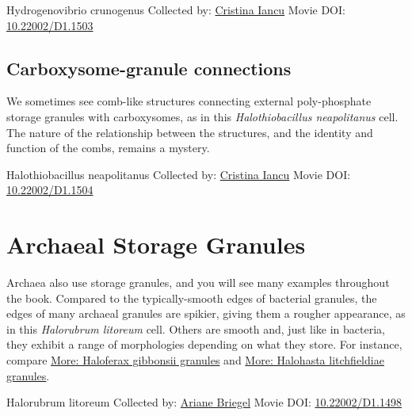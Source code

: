 \documentclass[]{tufte-book}
\begin{document}
\hypertarget{htmlwidget-d8c938f170242b9a8928}{}

\label{fig:4-9a}Hydrogenovibrio crunogenus Collected by: \protect\hyperlink{cristina_iancu}{Cristina Iancu} Movie DOI: \href{https://doi.org/10.22002/D1.1503}{10.22002/D1.1503}

\hypertarget{Carboxysome-granule_connections}{%
\subsection{Carboxysome-granule connections}\label{Carboxysome-granule_connections}}

We sometimes see comb-like structures connecting external poly-phosphate storage granules with carboxysomes, as in this \emph{Halothiobacillus neapolitanus} cell. The nature of the relationship between the structures, and the identity and function of the combs, remains a mystery.



\hypertarget{htmlwidget-87f6a2f9fd1053e7b88b}{}

\label{fig:4-9b}Halothiobacillus neapolitanus Collected by: \protect\hyperlink{cristina_iancu}{Cristina Iancu} Movie DOI: \href{https://doi.org/10.22002/D1.1504}{10.22002/D1.1504}

\hypertarget{archaeal-storage-granules}{%
\section{Archaeal Storage Granules}\label{archaeal-storage-granules}}

Archaea also use storage granules, and you will see many examples throughout the book. Compared to the typically-smooth edges of bacterial granules, the edges of many archaeal granules are spikier, giving them a rougher appearance, as in this \emph{Halorubrum litoreum} cell. Others are smooth and, just like in bacteria, they exhibit a range of morphologies depending on what they store. For instance, compare \protect\hyperlink{Haloferax_gibbonsii_granules}{More: Haloferax gibbonsii granules} and \protect\hyperlink{Halohasta_litchfieldiae_granules}{More: Halohasta litchfieldiae granules}.



\hypertarget{htmlwidget-0eaeaac5bd4467a0d93d}{}

\label{fig:4-10}Halorubrum litoreum Collected by: \protect\hyperlink{ariane_briegel}{Ariane Briegel} Movie DOI: \href{https://doi.org/10.22002/D1.1498}{10.22002/D1.1498}
\end{document}
